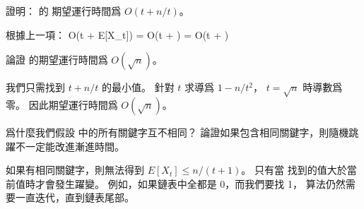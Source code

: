 \startigBase[continue]\startitem
證明：  的
期望運行時間爲 $O(t+n/t)$。
\stopitem\stopigBase

\startANSWER
根據上一項：
\startformula
O(t + E[X_t]) = O(t + ) = O(t + )
\stopformula
\stopANSWER

\startigBase[continue]\startitem
論證  的期望運行時間爲 $O(\sqrt{n})$。
\stopitem\stopigBase

\startANSWER
我們只需找到 $t+n/t$ 的最小值。
針對 $t$ 求導爲 $1-n/t^2$， $t=\sqrt{n}$ 時導數爲零。
因此期望運行時間爲 $O(\sqrt{n})$。
\stopANSWER

\startigBase[continue]\startitem
爲什麼我們假設  中的所有關鍵字互不相同？
論證如果包含相同關鍵字，則隨機跳躍不一定能改進漸進時間。
\stopitem\stopigBase

\startANSWER
如果有相同關鍵字，則無法得到 $E[X_t]\le n/(t+1)$。
只有當  找到的值大於當前值時才會發生躍變。
例如，如果鏈表中全都是 0，而我們要找 1，
算法仍然需要一直迭代，直到鏈表尾部。
\stopANSWER

\stopPROBLEM
